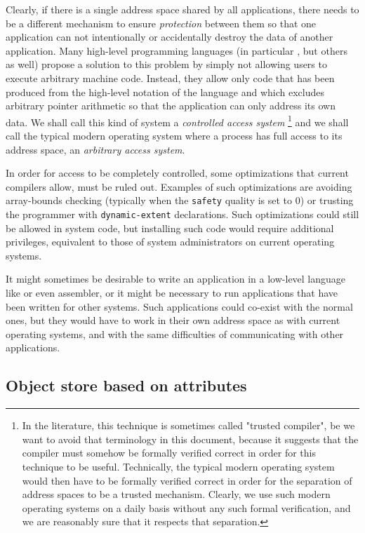 Clearly, if there is a single address space shared by all
applications, there needs to be a different mechanism to ensure
\emph{protection} between them so that one application can not
intentionally or accidentally destroy the data of another application.
Many high-level programming languages (in particular \lisp{}, but
others as well) propose a solution to this problem by simply not
allowing users to execute arbitrary machine code.  Instead, they allow
only code that has been produced from the high-level notation of the
language and which excludes arbitrary pointer arithmetic so that the
application can only address its own data.  We shall call this kind of
system a \emph{controlled access system}%
\footnote{In the literature, this technique is sometimes called
  "trusted compiler", be we want to avoid that terminology in this
  document, because it suggests that the compiler must somehow be
  formally verified correct in order for this technique to be useful.
  Technically, the typical modern operating system would then have to
  be formally verified correct in order for the separation of address
  spaces to be a trusted mechanism.  Clearly, we use such modern
  operating systems on a daily basis without any such formal
  verification, and we are reasonably sure that it respects that
  separation.} and we shall call the typical modern operating system
where a process has full access to its address space, an
\emph{arbitrary access system}.

In order for access to be completely controlled, some optimizations
that current \commonlisp{} compilers allow, must be ruled out.
Examples of such optimizations are avoiding array-bounds checking
(typically when the \texttt{safety} quality is set to $0$) or trusting
the programmer with \texttt{dynamic-extent} declarations.  Such
optimizations could still be allowed in system code, but installing
such code would require additional privileges, equivalent to those of
system administrators on current operating systems.

It might sometimes be desirable to write an application in a
low-level language like \clanguage{} or even assembler, or it might be
necessary to run applications that have been written for other
systems.  Such applications could co-exist with the normal ones, but
they would have to work in their own address space as with current
operating systems, and with the same difficulties of communicating
with other applications.  

\subsection{Object store based on attributes}

